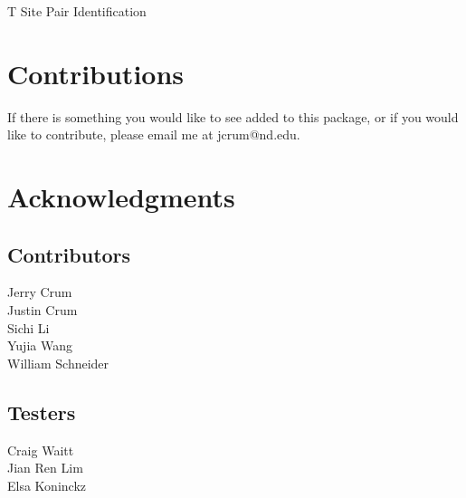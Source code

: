 \documentclass[11pt]{article}
\begin{document}
T Site Pair Identification

\section{Contributions}
\label{sec:orge3f432c}

If there is something you would like to see added to this package, or if you would like to contribute, please email me at jcrum@nd.edu.

\section{Acknowledgments}
\label{sec:orge43dc04}
\subsection{Contributors}
\label{sec:org578041e}

Jerry Crum \\
Justin Crum \\
Sichi Li \\
Yujia Wang \\
William Schneider

\subsection{Testers}
\label{sec:org39d918e}

Craig Waitt\\
Jian Ren Lim\\
Elsa Koninckz
\end{document}
